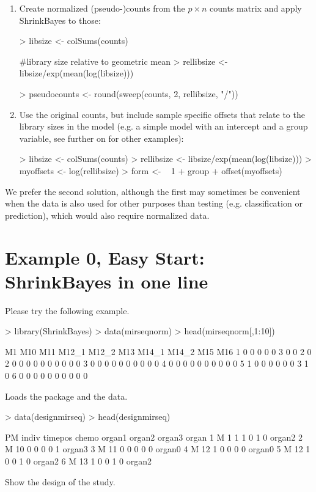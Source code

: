 \documentclass[11pt]{article}
\newcommand{\para}{\bigskip\noindent}
\begin{document}
\begin{enumerate}
\item Create normalized (pseudo-)counts from the $p \times n$ counts matrix and apply ShrinkBayes to those:
\begin{Sinput}
> libsize <- colSums(counts)

#library size relative to geometric mean
> rellibsize <- libsize/exp(mean(log(libsize))) 

> pseudocounts <- round(sweep(counts, 2, rellibsize, "/"))
\end{Sinput}
\item Use the original counts, but include sample specific offsets that relate to the library sizes in the model (e.g. a simple model with an intercept and a
group variable, see further on for other examples):
\begin{Sinput}
> libsize <- colSums(counts)
> rellibsize <- libsize/exp(mean(log(libsize))) 
> myoffsets <- log(rellibsize)
> form <- ~ 1 + group + offset(myoffsets)
\end{Sinput}
\end{enumerate}
We prefer the second solution, although the first may sometimes be convenient when the data is also used for other purposes than testing (e.g. classification or prediction),
which would also require normalized data. 


\section{Example 0, Easy Start: ShrinkBayes in one line}
Please try the following example.

\para
\begin{Schunk}
\begin{Sinput}
> library(ShrinkBayes)
> data(mirseqnorm)
> head(mirseqnorm[,1:10])
\end{Sinput}
\begin{Soutput}
  M1 M10 M11 M12_1 M12_2 M13 M14_1 M14_2 M15 M16
1  0   0   0     0     0   3     0     0   2   0
2  0   0   0     0     0   0     0     0   0   0
3  0   0   0     0     0   0     0     0   0   0
4  0   0   0     0     0   0     0     0   0   0
5  1   0   0     0     0   0     0     3   1   0
6  0   0   0     0     0   0     0     0   0   0
\end{Soutput}
\end{Schunk}
Loads the package and the data.

\para
\begin{Schunk}
\begin{Sinput}
> data(designmirseq)
> head(designmirseq)
\end{Sinput}
\begin{Soutput}
  PM indiv timepos chemo organ1 organ2 organ3  organ
1  M     1       1     1      0      1      0 organ2
2  M    10       0     0      0      0      1 organ3
3  M    11       0     0      0      0      0 organ0
4  M    12       1     0      0      0      0 organ0
5  M    12       1     0      0      1      0 organ2
6  M    13       1     0      0      1      0 organ2
\end{Soutput}
\end{Schunk}
Show the design of the study.
\end{document}
